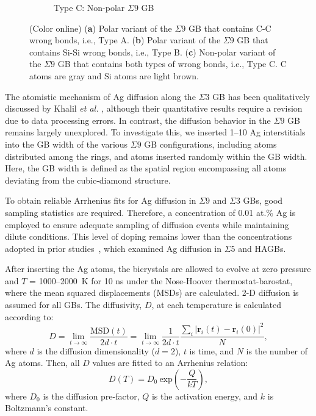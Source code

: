 \documentclass[%
preprint,
amsmath,amssymb,
aps,
]{revtex4-2}
\newcommand{\?}{\stackrel{?}{=}}
\begin{document}
\begin{figure}[h!]
\begin{subfigure}{0.3\textwidth}
 \caption{Type C: Non-polar $\Sigma 9$ GB}
 \label{Fig:S9-C}
\end{subfigure}
\caption{(Color online) (\textbf{a}) Polar variant of the $\Sigma 9$ GB that contains C-C wrong bonds, i.e., Type A. (\textbf{b}) Polar variant of the $\Sigma 9$ GB that contains Si-Si wrong bonds, i.e., Type B. (\textbf{c}) Non-polar variant of the $\Sigma 9$ GB that contains both types of wrong bonds, i.e., Type C. C atoms are gray and Si atoms are light brown.}
\label{Fig:S9}
\end{figure}

The atomistic mechanism of Ag diffusion along the $\Sigma 3$ GB has been qualitatively discussed by Khalil \textit{et al.} \cite{Khalil2011}, although their quantitative results require a revision due to data processing errors. In contrast, the diffusion behavior in the $\Sigma 9$ GB remains largely unexplored. To investigate this, we inserted 1--10 Ag interstitials into the GB width of the various $\Sigma 9$ GB configurations, including atoms distributed among the rings, and atoms inserted randomly within the GB width. Here, the GB width is defined as the spatial region encompassing all atoms deviating from the cubic-diamond structure.

To obtain reliable Arrhenius fits for Ag diffusion in $\Sigma 9$ and $\Sigma 3$ GBs, good sampling statistics are required. Therefore, a concentration of 0.01 at.\% Ag is employed to ensure adequate sampling of diffusion events while maintaining dilute conditions. This level of doping remains lower than the concentrations adopted in prior studies~\cite{Jiang2021, Aagesen2022}, which examined Ag diffusion in $\Sigma 5$ and HAGBs.

After inserting the Ag atoms, the bicrystals are allowed to evolve at zero pressure and $T$ = 1000--2000~K for 10 ns under the Nose-Hoover thermostat-barostat, where the mean squared displacements (MSDs) are calculated. 2-D diffusion is assumed for all GBs. The diffusivity, $D$, at each temperature is calculated according to:
\begin{equation}
D = \lim_{t \rightarrow \infty} \frac{\text{MSD}(t)}{2d \cdot t} = \lim_{t \rightarrow \infty} \frac{1}{2d \cdot t} \frac{ \sum_i \left| \mathbf{r}_{i}(t) - \mathbf{r}_i(0) \right|^2 }{ N },
\label{Eq:D1}
\end{equation}
where $d$ is the diffusion dimensionality ($d=2$), $t$ is time, and $N$ is the number of Ag atoms. Then, all $D$ values are fitted to an Arrhenius relation:
\begin{equation}
D(T) = D_0 \ \text{exp}\left( - \frac{Q}{k T} \right),
\label{Eq:D2}
\end{equation}
where $D_0$ is the diffusion pre-factor, $Q$ is the activation energy, and $k$ is Boltzmann's constant.
\end{document}

